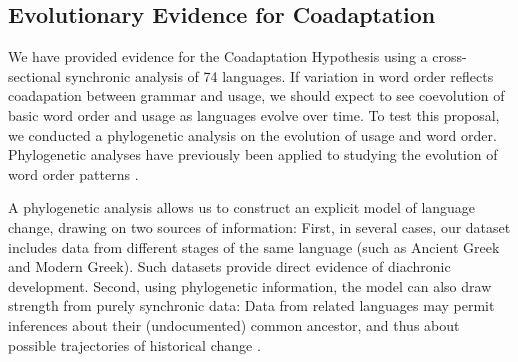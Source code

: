 \documentclass[11pt,a4paper]{article}
\begin{document}


\subsection*{Evolutionary Evidence for Coadaptation}
We have provided evidence for the Coadaptation Hypothesis using a cross-sectional synchronic analysis of 74 languages.
If variation in word order reflects coadapation between grammar and usage, we should expect to see coevolution of basic word order and usage as languages evolve over time.
To test this proposal, we conducted a phylogenetic analysis on the evolution of usage and word order.
Phylogenetic analyses have previously been applied to studying the evolution of word order patterns \citep{dunn-evolved-2011, maurits2014tracing}.

A phylogenetic analysis allows us to construct an explicit model of language change, drawing on two sources of information:
First, in several cases, our dataset includes data from different stages of the same language (such as Ancient Greek and Modern Greek).
Such datasets provide direct evidence of diachronic development.
Second, using phylogenetic information, the model can also draw strength from purely synchronic data:
Data from related languages may permit inferences about their (undocumented) common ancestor, and thus about possible trajectories of historical change \citep{pagel2004bayesian, dunn-evolved-2011, maurits2014tracing}.
\end{document}
